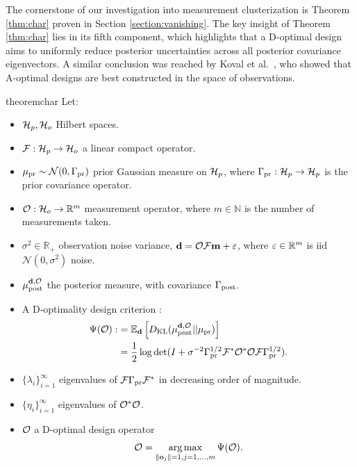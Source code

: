 The cornerstone of our investigation into measurement clusterization
is Theorem \ref{thm:char} proven in Section
\ref{section:vanishing}. The key insight of Theorem \ref{thm:char}
lies in its fifth component, which highlights that a D-optimal design
aims to uniformly reduce posterior uncertainties across all posterior
covariance eigenvectors. A similar conclusion was reached by Koval et
al.~\cite{koval2020}, who showed that A-optimal designs are best
constructed in the space of observations.


\begin{restatable}{theorem}{char}\label{thm:char}
  Let:
  \begin{itemize}
  \item $\mathcal{H}_p, \mathcal{H}_o$ Hilbert spaces.
  \item $\mathcal{F}:\mathcal{H}_p \to \mathcal{H}_o$ a linear compact operator.
  \item $\mu_{\textup{pr}} \sim \mathcal{N}(0, \Gamma_{\textup{pr}})$ prior Gaussian measure on $\mathcal{H}_p$,
    where $\Gamma_{\textup{pr}}:\mathcal{H}_p \to \mathcal{H}_p$ is the prior covariance operator.
  \item $\mathcal{O}: \mathcal{H}_o \to \mathbb{R}^m$ measurement operator, where $m
    \in \mathbb{N}$ is the number of measurements taken.
  \item $\sigma^2 \in \mathbb{R}_{+}$ observation noise variance,
    $\mathbf{d} = \mathcal{O} \mathcal{F} \mathbf{m} + \varepsilon$, where $\varepsilon \in \mathbb{R}^m$
    is iid $\mathcal{N}(0, \sigma^2)$ noise.
  \item $\mu_{\textup{post}}^{\mathbf{d}, \mathcal{O}}$ the posterior measure, with covariance $\Gamma_{\textup{post}}$.
  \item A D-optimality design criterion
    \cite{AlexanderianGloorGhattas14}:
    \begin{align*}
      \begin{split}
        \tar(\obs) :&= \mathbb{E}_{\data}\left [ D_{\text{KL}} (\post || \pr ) \right ] \\
        &= \frac12 \log \det ( I + \sigma^{-2} \prcov^{1/2} \fwd ^*
        \obs^* \obs \fwd \prcov^{1/2}).
      \end{split}
    \end{align*}
  \item $\{\lambda_i\}_{i=1}^\infty$ eigenvalues of $\mathcal{F}\Gamma_{\textup{pr}}\mathcal{F}^*$
    in decreasing order of magnitude.
  \item $\{\eta_i\}_{i=1}^\infty$ eigenvalues of $\mathcal{O}^*\mathcal{O}$.
  \item $\mathcal{O}$ a D-optimal design operator
    \begin{equation*}
      \obs = \argmax_{\|\meas_j\| = 1, j=1,\dots,m}\tar(\obs).
    \end{equation*}
  \end{itemize}


\end{restatable}
